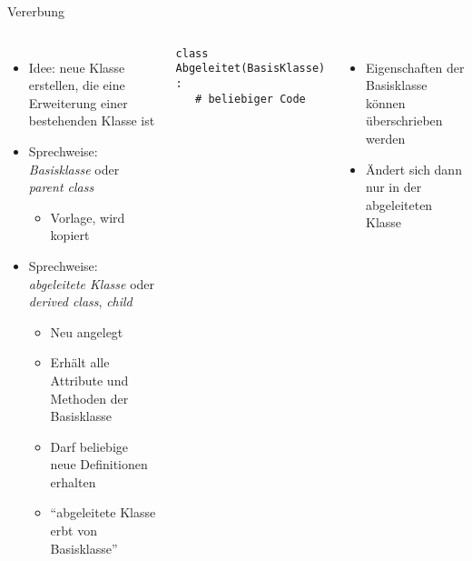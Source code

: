 
\begin{frame}[fragile]{Vererbung}
%
\begin{columns}[T]
\begin{itemize}
\item Idee: neue Klasse erstellen, die eine Erweiterung einer bestehenden Klasse ist
\item Sprechweise: \emph{Basisklasse} oder \emph{parent class}
	\begin{itemize}
	\item Vorlage, wird kopiert
	\end{itemize}
\item Sprechweise: \emph{abgeleitete Klasse} oder \emph{derived class}, \emph{child}
	\begin{itemize}
	\item Neu angelegt
	\item Erhält alle Attribute und Methoden der Basisklasse
	\item Darf beliebige neue Definitionen erhalten
	\item \enquote{abgeleitete Klasse erbt von Basisklasse}
	\end{itemize}
\end{itemize}
%
\begin{codebox}
\begin{verbatim}
class Abgeleitet(BasisKlasse) :
   # beliebiger Code
\end{verbatim}
\end{codebox}
%
\begin{itemize}
\item Eigenschaften der Basisklasse können überschrieben werden
\item Ändert sich dann nur in der abgeleiteten Klasse
\end{itemize}
\end{columns}
%
\end{frame}


